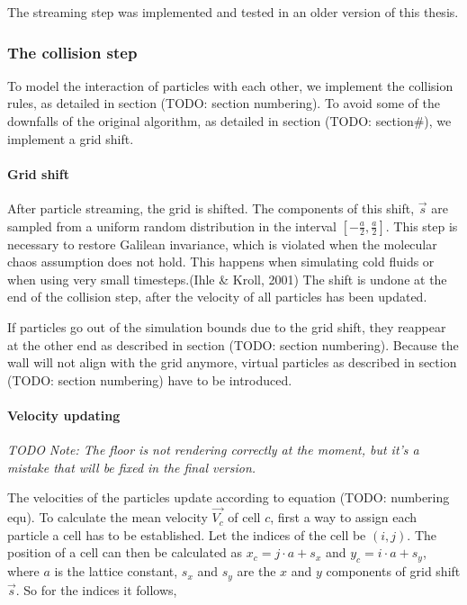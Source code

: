 \documentclass[
]{article}
\begin{document}
The streaming step was implemented and tested in an older version of
this thesis.

\hypertarget{the-collision-step-1}{%
\subsubsection{The collision step}\label{the-collision-step-1}}

To model the interaction of particles with each other, we implement the
collision rules, as detailed in section (TODO: section numbering). To
avoid some of the downfalls of the original algorithm, as detailed in
section (TODO: section\#), we implement a grid shift.

\hypertarget{grid-shift}{%
\paragraph{Grid shift}\label{grid-shift}}

After particle streaming, the grid is shifted. The components of this
shift, \(\vec{s}\) are sampled from a uniform random distribution in the
interval \([-\frac{a}{2},\frac{a}{2}]\). This step is necessary to
restore Galilean invariance, which is violated when the molecular chaos
assumption does not hold. This happens when simulating cold fluids or
when using very small timesteps.(Ihle \& Kroll, 2001) The shift is
undone at the end of the collision step, after the velocity of all
particles has been updated.

If particles go out of the simulation bounds due to the grid shift, they
reappear at the other end as described in section (TODO: section
numbering). Because the wall will not align with the grid anymore,
virtual particles as described in section (TODO: section numbering) have
to be introduced.

\hypertarget{velocity-updating}{%
\paragraph{Velocity updating}\label{velocity-updating}}

\emph{TODO} \emph{Note: The floor is not rendering correctly at the
moment, but it's a mistake that will be fixed in the final version.}

The velocities of the particles update according to equation (TODO:
numbering equ). To calculate the mean velocity \(\vec{V_{c}}\) of cell
\(c\), first a way to assign each particle a cell has to be established.
Let the indices of the cell be \((i, j)\). The position of a cell can
then be calculated as \(x_c = j \cdot a + s_x\) and
\(y_c = i \cdot a + s_y\), where \(a\) is the lattice constant, \(s_x\)
and \(s_y\) are the \(x\) and \(y\) components of grid shift
\(\vec{s}\). So for the indices it follows,
\end{document}
